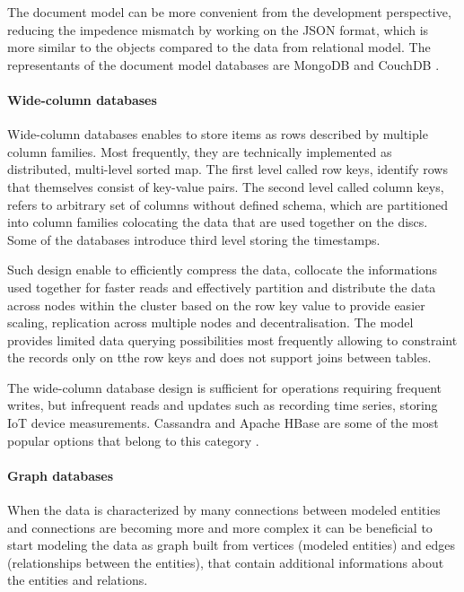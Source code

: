 The document model can be more convenient from the development perspective, reducing the impedence mismatch by working on the JSON format, which is more similar to the objects compared to the data from relational model. The representants of the document model databases are MongoDB and CouchDB \cite{DesignDataIntensiveApplications}.

\paragraph*{Wide-column databases}

Wide-column databases enables to store items as rows described by multiple column families. Most frequently, they are technically implemented as distributed, multi-level sorted map. The first level called row keys, identify rows that themselves consist of key-value pairs. The second level called column keys, refers to arbitrary set of columns without defined schema, which are partitioned into column families colocating the data that are used together on the discs. Some of the databases introduce third level storing the timestamps. 

Such design enable to efficiently compress the data, collocate the informations used together for faster reads and effectively partition and distribute the data across nodes within the cluster based on the row key value to provide easier scaling, replication across multiple nodes and decentralisation. The model provides limited data querying possibilities most frequently allowing to constraint the records only on tthe row keys and does not support joins between tables.

The wide-column database design is sufficient for operations requiring frequent writes, but infrequent reads and updates such as recording time series, storing IoT device measurements. Cassandra and Apache HBase are some of the most popular options that belong to this category \cite{NoSQLDatabaseSystemsSurveyDecisionGuidance}.

\paragraph*{Graph databases}

When the data is characterized by many connections between modeled entities and connections are becoming more and more complex it can be beneficial to start modeling the data as graph built from vertices (modeled entities) and edges (relationships between the entities), that contain additional informations about the entities and relations. 

